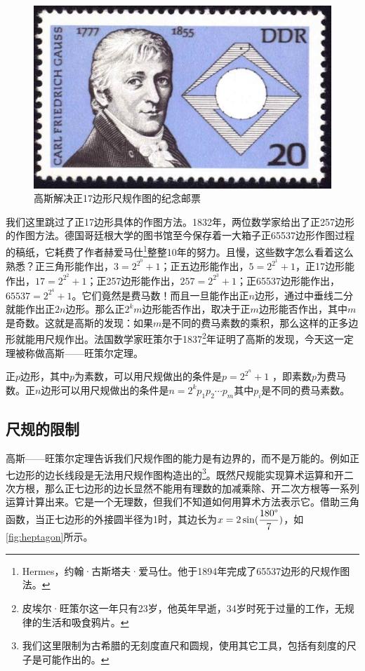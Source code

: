 \documentclass[b5paper]{ctexart}
\begin{document}
\begin{figure}[htbp]
 \centering
 \includegraphics[scale=0.5]{img/gauss-17gon}
 \caption{高斯解决正17边形尺规作图的纪念邮票}
 \label{fig:gauss-17gon}
\end{figure}

我们这里跳过了正17边形具体的作图方法。1832年，两位数学家给出了正257边形的作图方法。德国哥廷根大学的图书馆至今保存着一大箱子正65537边形作图过程的稿纸，它耗费了作者赫爱马仕\footnote{Hermes，约翰·古斯塔夫·爱马仕。他于1894年完成了65537边形的尺规作图法。}整整10年的努力。且慢，这些数字怎么看着这么熟悉？正三角形能作出，$3 = 2^{2^0} + 1$；正五边形能作出，$5 = 2^{2^1} + 1$，正17边形能作出，$17 = 2^{2^2} + 1$；正257边形能作出，$257 = 2^{2^3} + 1$；正65537边形能作出，$65537 = 2^{2^4} + 1$。它们竟然是费马数！而且一旦能作出正$n$边形，通过中垂线二分就能作出正$2n$边形。那么正$2^k m$边形能否作出，取决于正$m$边形能否作出，其中$m$是奇数。这就是高斯的发现：如果$m$是不同的费马素数的乘积，那么这样的正多边形就能用尺规作出。法国数学家旺策尔于1837\footnote{皮埃尔·旺策尔这一年只有23岁，他英年早逝，34岁时死于过量的工作，无规律的生活和吸食鸦片。}年证明了高斯的发现，今天这一定理被称做高斯——旺策尔定理。

\begin{theorem}[高斯——旺策尔]
正$p$边形，其中$p$为素数，可以用尺规做出的条件是$p=2^{2^n} + 1$ ，即素数$p$为费马数。正$n$边形可以用尺规做出的条件是$n=2^k p_1 p_2 \dotsm p_m$其中$p_i$是不同的费马素数\cite{Edward-1977}。
\end{theorem}

\subsection{尺规的限制}
高斯——旺策尔定理告诉我们尺规作图的能力是有边界的，而不是万能的。例如正七边形的边长线段是无法用尺规作图构造出的\footnote{我们这里限制为古希腊的无刻度直尺和圆规，使用其它工具，包括有刻度的尺子是可能作出的。}。既然尺规能实现算术运算和开二次方根，那么正七边形的边长显然不能用有理数的加减乘除、开二次方根等一系列运算计算出来。它是一个无理数，但我们不知道如何用算术方法表示它。借助三角函数，当正七边形的外接圆半径为1时，其边长为$x = 2\sin(\dfrac{180\degree}{7})$，如\cref{fig:heptagon}所示。
\end{document}
